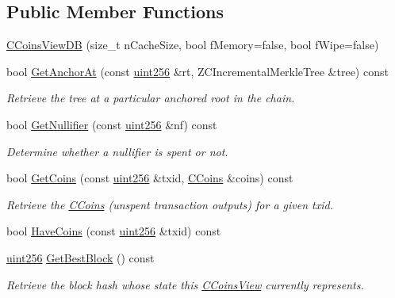 \subsection*{Public Member Functions}
\begin{DoxyCompactItemize}
\item 
\mbox{\hyperlink{class_c_coins_view_d_b_a209841b241febcccb2ec584b886ad374}{C\+Coins\+View\+DB}} (size\+\_\+t n\+Cache\+Size, bool f\+Memory=false, bool f\+Wipe=false)
\item 
bool \mbox{\hyperlink{class_c_coins_view_d_b_aeaab3bc4b363dbbc9d9a77930209e299}{Get\+Anchor\+At}} (const \mbox{\hyperlink{classuint256}{uint256}} \&rt, Z\+C\+Incremental\+Merkle\+Tree \&tree) const
\begin{DoxyCompactList}\small\item\em Retrieve the tree at a particular anchored root in the chain. \end{DoxyCompactList}\item 
bool \mbox{\hyperlink{class_c_coins_view_d_b_ac9724829164f5a06b6d7c610da03a730}{Get\+Nullifier}} (const \mbox{\hyperlink{classuint256}{uint256}} \&nf) const
\begin{DoxyCompactList}\small\item\em Determine whether a nullifier is spent or not. \end{DoxyCompactList}\item 
bool \mbox{\hyperlink{class_c_coins_view_d_b_ac35a80d1115ec697101d382e71db5b31}{Get\+Coins}} (const \mbox{\hyperlink{classuint256}{uint256}} \&txid, \mbox{\hyperlink{class_c_coins}{C\+Coins}} \&coins) const
\begin{DoxyCompactList}\small\item\em Retrieve the \mbox{\hyperlink{class_c_coins}{C\+Coins}} (unspent transaction outputs) for a given txid. \end{DoxyCompactList}\item 
bool \mbox{\hyperlink{class_c_coins_view_d_b_af55f35faadeb74b5406559fe3ed20114}{Have\+Coins}} (const \mbox{\hyperlink{classuint256}{uint256}} \&txid) const
\item 
\mbox{\hyperlink{classuint256}{uint256}} \mbox{\hyperlink{class_c_coins_view_d_b_ac9c513a34b9e58d942fdbeafd9e5bbce}{Get\+Best\+Block}} () const
\begin{DoxyCompactList}\small\item\em Retrieve the block hash whose state this \mbox{\hyperlink{class_c_coins_view}{C\+Coins\+View}} currently represents. \end{DoxyCompactList}\item 

\end{DoxyCompactItemize}
